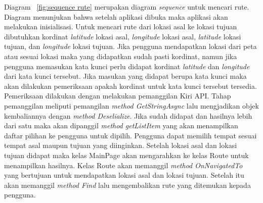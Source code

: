 \hspace{0.5cm} Diagram ~\ref{fig:sequence rute} merupakan diagram \textit{sequence} untuk mencari rute. Diagram menunjukan bahwa setelah aplikasi dibuka maka aplikasi akan melakukan inisialisasi. Untuk mencari rute dari lokasi asal ke lokasi tujuan dibutuhkan kordinat \textit{latitude} lokasi asal, \textit{longitude} lokasi asal, \textit{latitude} lokasi tujuan, dan \textit{longitude} lokasi tujuan. Jika pengguna mendapatkan lokasi dari peta atau sesuai lokasi maka yang didapatkan sudah pasti kordinat, namun jika pengguna memasukan kata kunci perlu didapat kordinat \textit{latitude} dan \textit{longitude} dari kata kunci tersebut. Jika masukan yang didapat berupa kata kunci maka akan dilakukan pemeriksaan apakah kordinat untuk kata kunci tersebut tersedia. Pemeriksaan dilakukan dengan melakukan pemanggilan Kiri API. Tahap pemanggilan meliputi pemangilan \textit{method GetStringAsync} lalu mengjadikan objek kembaliannya dengan \textit{method Deselialize}. Jika sudah didapat dan hasilnya lebih dari satu maka akan dipanggil \textit{method getListItem} yang akan menampilkan daftar pilihan ke pengguna untuk dipilih. Pengguna dapat memilih tempat sesuai tempat asal maupun tujuan yang diinginkan. Setelah lokasi asal dan lokasi tujuan didapat maka kelas MainPage akan mengarahkan ke kelas Route untuk menampilkan hasilnya. Kelas Route akan memanggil \textit{method OnNavigatedTo} yang bertujuan untuk mendapatkan lokasi asal dan lokasi tujuan. Setelah itu akan memanggil \textit{method Find} lalu mengembalikan rute yang ditemukan kepada pengguna.

\newpage

